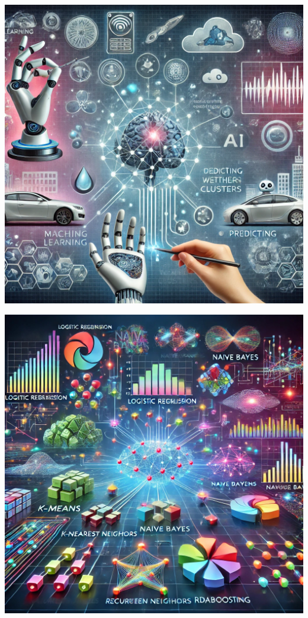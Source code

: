 \documentclass[
  letterpaper,
  DIV=11,
  numbers=noendperiod]{scrreprt}
\begin{document}
\includegraphics[width=1\linewidth,height=\textheight,keepaspectratio]{fig/ML_gpt.png}

\includegraphics[width=1\linewidth,height=\textheight,keepaspectratio]{fig/ML_models.png}
\end{document}
